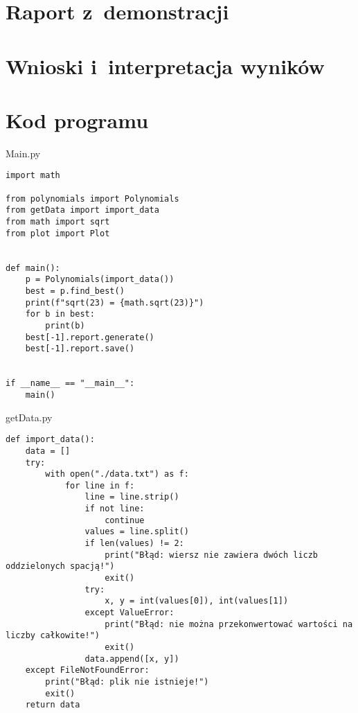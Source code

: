 \documentclass[12pt]{article}
\begin{document}
\section{Raport z~demonstracji}

\section{Wnioski i~interpretacja wyników}

\section{Kod programu}
Main.py
\begin{lstlisting}[frame=single]
import math

from polynomials import Polynomials
from getData import import_data
from math import sqrt
from plot import Plot


def main():
    p = Polynomials(import_data())
    best = p.find_best()
    print(f"sqrt(23) = {math.sqrt(23)}")
    for b in best:
        print(b)
    best[-1].report.generate()
    best[-1].report.save()


if __name__ == "__main__":
    main()

\end{lstlisting}

getData.py
\begin{lstlisting}[frame=single]
def import_data():
    data = []
    try:
        with open("./data.txt") as f:
            for line in f:
                line = line.strip()
                if not line:
                    continue
                values = line.split()
                if len(values) != 2:
                    print("Błąd: wiersz nie zawiera dwóch liczb oddzielonych spacją!")
                    exit()
                try:
                    x, y = int(values[0]), int(values[1])
                except ValueError:
                    print("Błąd: nie można przekonwertować wartości na liczby całkowite!")
                    exit()
                data.append([x, y])
    except FileNotFoundError:
        print("Błąd: plik nie istnieje!")
        exit()
    return data
\end{lstlisting}
\end{document}
